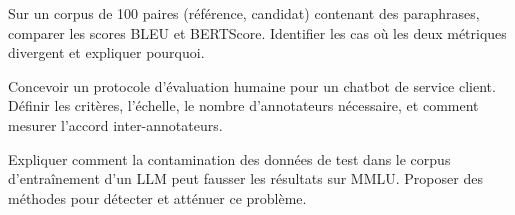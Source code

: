 \begin{exercice}
Sur un corpus de 100 paires (r\'ef\'erence, candidat) contenant des
paraphrases, comparer les scores BLEU et BERTScore. Identifier les cas
o\`u les deux m\'etriques divergent et expliquer pourquoi.
\end{exercice}

\begin{exercice}
Concevoir un protocole d'\'evaluation humaine pour un chatbot de service
client. D\'efinir les crit\`eres, l'\'echelle, le nombre d'annotateurs
n\'ecessaire, et comment mesurer l'accord inter-annotateurs.
\end{exercice}

\begin{exercice}
Expliquer comment la contamination des donn\'ees de test dans le corpus
d'entra\^inement d'un LLM peut fausser les r\'esultats sur MMLU.
Proposer des m\'ethodes pour d\'etecter et att\'enuer ce probl\`eme.
\end{exercice}
